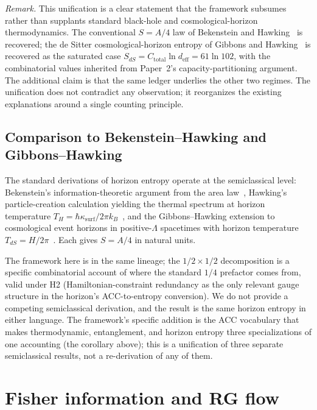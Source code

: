 \documentclass[11pt]{article}
\theoremstyle{remark}
\begin{document}
\noindent\textit{Remark.}  This unification is a clear statement that the
framework subsumes rather than supplants standard black-hole and
cosmological-horizon thermodynamics.  The conventional $S = A/4$ law of
Bekenstein and Hawking~\cite{Bekenstein1973,Hawking1975} is recovered; the
de Sitter cosmological-horizon entropy of Gibbons and
Hawking~\cite{GibbonsHawking1977} is recovered as the saturated case
$S_{dS} = C_{\mathrm{total}} \ln d_{\mathrm{eff}} = 61 \ln 102$, with the
combinatorial values inherited from Paper~2's capacity-partitioning
argument.  The additional claim is that the same ledger underlies the
other two regimes.  The unification does not contradict any observation;
it reorganizes the existing explanations around a single counting
principle.

\subsection{Comparison to Bekenstein--Hawking and Gibbons--Hawking}

The standard derivations of horizon entropy operate at the semiclassical
level: Bekenstein's information-theoretic argument from the area
law~\cite{Bekenstein1973}, Hawking's particle-creation calculation
yielding the thermal spectrum at horizon temperature $T_H =
\hbar \kappa_{\mathrm{surf}} / 2\pi k_B$~\cite{Hawking1975}, and the
Gibbons--Hawking extension to cosmological event horizons in
positive-$\Lambda$ spacetimes with horizon temperature
$T_{dS} = H/2\pi$~\cite{GibbonsHawking1977}.  Each gives
$S = A/4$ in natural units.

The framework here is in the same lineage; the $1/2 \times 1/2$
decomposition is a specific combinatorial account of where the standard
$1/4$ prefactor comes from, valid under H2 (Hamiltonian-constraint
redundancy as the only relevant gauge structure in the horizon's
ACC-to-entropy conversion).  We do not provide a competing semiclassical
derivation, and the result is the same horizon entropy in either
language.  The framework's specific addition is the ACC vocabulary that
makes thermodynamic, entanglement, and horizon entropy three
specializations of one accounting (the corollary above); this is a
unification of three separate semiclassical results, not a re-derivation
of any of them.


\section{Fisher information and RG flow}
\label{sec:Fisher}
\end{document}
